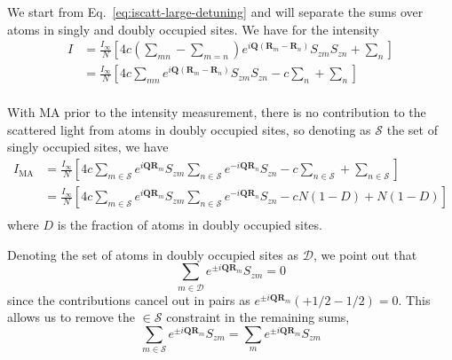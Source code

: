 \documentclass[11pt,letter]{article}
\newcommand{\bv}[1]{\ensuremath{\bm{#1}}}
\newcommand{\itof}{\ensuremath{I_{\infty} }}
\begin{document}
We start from Eq.~\ref{eq:iscatt-large-detuning} and will separate the sums
over atoms in singly and doubly occupied sites.  We have for the intensity
\begin{equation}
\begin{split} 
 I 
&  = \frac{ \itof  }{N} 
  \left[ 4 c 
   \left( \sum_{mn} - \sum_{m=n} \right) 
      e^{ i \bv{Q}( \bv{R}_{m} - \bv{R}_{n} ) } 
      S_{zm}S_{zn}
  + \sum_{n}  
   \right]  \\ 
&  = \frac{ \itof }{N} 
  \left[ 
      4 c \sum_{mn}  
      e^{ i \bv{Q}( \bv{R}_{m} - \bv{R}_{n} ) } 
      S_{zm}S_{zn}
    -  c  \sum_{n} 
  + \sum_{n}  
   \right]  \\ 
\end{split}
\end{equation}

With MA prior to the intensity measurement, there is no contribution to the
scattered light from atoms in doubly occupied sites, so denoting as
$\mathcal{S}$ the set of singly occupied sites, we have 
\begin{equation}
\begin{split} 
 I_{\text{MA}} 
&  = \frac{ \itof }{N} 
  \left[ 
      4 c \sum_{m\in \mathcal{S}}  
      e^{ i \bv{Q} \bv{R}_{m} } S_{zm} 
      \sum_{n\in \mathcal{S} } 
      e^{ -i \bv{Q} \bv{R}_{n} } S_{zn} 
    -  c  \sum_{n\in \mathcal{S}} 
  + \sum_{n \in \mathcal{S}}  
   \right]  \\ 
&  = \frac{ \itof }{N} 
  \left[ 
      4 c \sum_{m\in \mathcal{S}}  
      e^{ i \bv{Q} \bv{R}_{m} } S_{zm} 
      \sum_{n\in \mathcal{S} } 
      e^{ -i \bv{Q} \bv{R}_{n} } S_{zn} 
    -  c N(1-D)  + N(1-D) 
   \right]  \\ 
\end{split}
\end{equation}
where $D$ is the fraction of atoms in doubly occupied sites.  

Denoting the set of atoms in doubly occupied sites as $\mathcal{D}$, we point
out that 
\begin{equation}
 \sum_{m \in \mathcal{D} }  e^{ \pm i \bv{Q} \bv{R}_{m}} S_{zm} = 0 
\end{equation}
since the contributions cancel out in pairs as $   e^{ \pm i \bv{Q} \bv{R}_{m}}
( +1/2 - 1/2 ) = 0 $.  This allows us to remove the $\in \mathcal{S}$
constraint in the remaining sums, 
\begin{equation}
 \sum_{m \in \mathcal{S} }  e^{ \pm i \bv{Q} \bv{R}_{m}} S_{zm} = 
 \sum_{m}  e^{ \pm i \bv{Q} \bv{R}_{m}} S_{zm}  
\end{equation}
\end{document}
